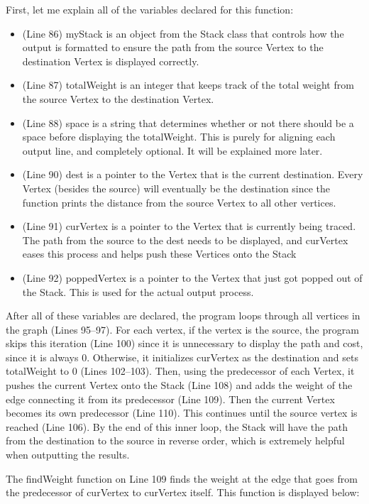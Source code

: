 \documentclass[letterpaper, 10pt]{article}
\begin{document}
\noindent
First, let me explain all of the variables declared for this function:
\begin{itemize}
    \item (Line 86) myStack is an object from the Stack class that controls how the output is formatted to ensure the path from the source Vertex to the destination Vertex is displayed correctly.
    \item (Line 87) totalWeight is an integer that keeps track of the total weight from the source Vertex to the destination Vertex.
    \item (Line 88) space is a string that determines whether or not there should be a space before displaying the totalWeight. This is purely for aligning each output line, and completely optional. It will be explained more later.
    \item (Line 90) dest is a pointer to the Vertex that is the current destination. Every Vertex (besides the source) will eventually be the destination since the function prints the distance from the source Vertex to all other vertices. 
    \item (Line 91) curVertex is a pointer to the Vertex that is currently being traced. The path from the source to the dest needs to be displayed, and curVertex eases this process and helps push these Vertices onto the Stack
    \item (Line 92) poppedVertex is a pointer to the Vertex that just got popped out of the Stack. This is used for the actual output process.
\end{itemize}

\noindent
After all of these variables are declared, the program loops through all vertices in the graph (Lines 95–97). For each vertex, if the vertex is the source, the program skips this iteration (Line 100) since it is unnecessary to display the path and cost, since it is always 0. Otherwise, it initializes curVertex as the destination and sets totalWeight to 0 (Lines 102–103). Then, using the predecessor of each Vertex, it pushes the current Vertex onto the Stack (Line 108) and adds the weight of the edge connecting it from its predecessor (Line 109). Then the current Vertex becomes its own predecessor (Line 110). This continues until the source vertex is reached (Line 106). By the end of this inner loop, the Stack will have the path from the destination to the source in reverse order, which is extremely helpful when outputting the results.

\vspace{1em}
\noindent
The findWeight function on Line 109 finds the weight at the edge that goes from the predecessor of curVertex to curVertex itself. This function is displayed below:
\end{document}
